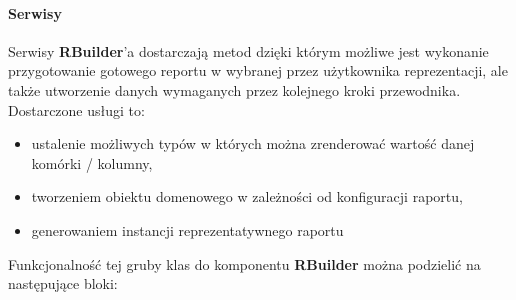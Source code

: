 			\paragraph{Serwisy}
			Serwisy \textbf{RBuilder}'a dostarczają metod dzięki którym możliwe jest wykonanie przygotowanie gotowego reportu
			w wybranej przez użytkownika reprezentacji, ale także utworzenie danych wymaganych przez kolejnego kroki przewodnika.
			Dostarczone usługi to:
			\begin{itemize}
				\item ustalenie możliwych typów w których można zrenderować wartość danej komórki / kolumny,
				\item tworzeniem obiektu domenowego w zależności od konfiguracji raportu,
				\item generowaniem instancji reprezentatywnego raportu
			\end{itemize}
			Funkcjonalność tej gruby klas do komponentu \textbf{RBuilder} można podzielić na następujące bloki:
